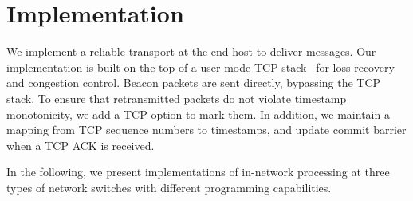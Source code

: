 \section{Implementation}
\label{sec:impl}


We implement a reliable transport at the end host to deliver messages. Our implementation is built on the top of a user-mode TCP stack~\cite{dunkels2001design} for loss recovery and congestion control. Beacon packets are sent directly, bypassing the TCP stack. To ensure that retransmitted packets do not violate timestamp monotonicity, we add a TCP option to mark them. In addition, we maintain a mapping from TCP sequence numbers to timestamps, and update commit barrier when a TCP ACK is received.

In the following, we present implementations of in-network processing at three types of network switches with different programming capabilities. 

